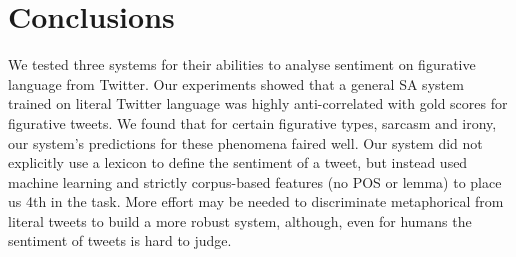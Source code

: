 \documentclass[11pt,letterpaper]{article}
\begin{document}





\section{Conclusions}
We tested three systems for their abilities to analyse sentiment on figurative language from Twitter. Our experiments showed that a general SA system trained on literal Twitter language was highly anti-correlated with gold scores for figurative tweets. We found that for certain figurative types, sarcasm and irony, our system's predictions for these phenomena faired well. Our system did not explicitly use a lexicon to define the sentiment of a tweet, but instead used machine learning and strictly corpus-based features (no POS or lemma) to place us 4th in the task. %
More effort may be needed to discriminate  metaphorical from literal tweets to build a more robust system, although, even for humans the sentiment of tweets is hard to judge.%






\end{document}
